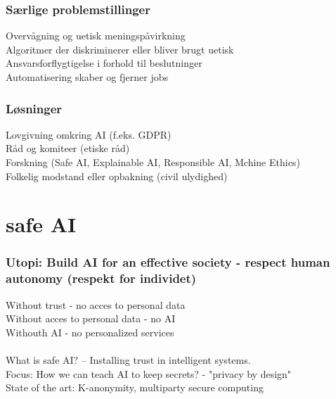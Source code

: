 \documentclass[11pt, fleqn]{article}
\begin{document}
	\subsubsection*{Særlige problemstillinger}
	\vspace*{-0.2cm}
	Overvågning og uetisk meningspåvirkning \\
	Algoritmer der diskriminerer eller bliver brugt uetisk \\
	Ansvarsforflygtigelse i forhold til beslutninger \\ 
	Automatisering skaber og fjerner jobs 
	
	\subsubsection*{Løsninger}
	\vspace*{-0.2cm}
	Lovgivning omkring AI (f.eks. GDPR) \\
	Råd og komiteer (etiske råd)\\
	Forskning (Safe AI, Explainable AI, Responsible AI, Mchine Ethics) \\
	Folkelig modstand eller opbakning (civil ulydighed)
	
	\section*{safe AI}
	
	\subsubsection*{Utopi: Build AI for an effective society - respect human autonomy (respekt for individet)}
	\vspace*{-0.2cm}
	Without trust - no acces to personal data \\
	Without acces to personal data - no AI \\
	Withouth AI - no personalized services \\\\
	\noindent
	What is safe AI? -- Installing trust in intelligent systems. \\ Focus: How we can teach AI to keep secrets? - "privacy by design" \\ 
	State of the art: K-anonymity, multiparty secure computing 
	
\end{document}
